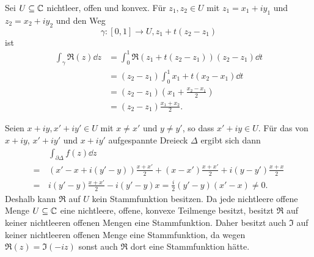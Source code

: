 \documentclass[a4paper,10pt]{article}
\begin{document}
Sei $U \subseteq \mathbb{C}$ nichtleer, offen und konvex. Für $z_1, z_2 \in U$ mit $z_1 = x_1 + iy_1$ und $z_2 = x_2 + iy_2$ und den Weg
\[
 \gamma : [0,1] \to U, z_1 + t(z_2 - z_1)
\]
ist
\begin{align*}
 \int_\gamma \Re(z) \dd{z}
 &= \int_0^1 \Re(z_1 + t(z_2 - z_1)) (z_2 - z_1) \dd{t} \\
 &= (z_2 - z_1) \int_0^1 x_1 + t(x_2 - x_1) \dd{t} \\
 &= (z_2 - z_1) \left( x_1 + \frac{x_2 - x_1}{2} \right) \\
 &= (z_2 - z_1) \frac{x_1 + x_2}{2}.
\end{align*}

Seien $x+iy, x'+iy' \in U$ mit $x \neq x'$ und $y \neq y'$, so dass $x'+iy \in U$. Für das von $x+iy$, $x'+iy'$ und $x+iy'$ aufgespannte Dreieck $\Delta$ ergibt sich dann
\begin{align*}
  &\, \int_{\partial \Delta} f(z) \dd{z} \\
 =&\, (x'-x+i(y'-y))\frac{x+x'}{2} + (x-x')\frac{x+x'}{2} + i(y-y')\frac{x+x}{2} \\
 =&\, i(y'-y) \frac{x+x'}{2} - i(y'-y)x
 = \frac{i}{2}(y'-y)(x'-x)
 \neq 0.
\end{align*}
Deshalb kann $\Re$ auf $U$ kein Stammfunktion besitzen. Da jede nichtleere offene Menge $U \subseteq \mathbb{C}$ eine nichtleere, offene, konvexe Teilmenge besitzt, besitzt $\Re$ auf keiner nichtleeren offenen Mengen eine Stammfunktion. Daher besitzt auch $\Im$ auf keiner nichtleeren offenen Menge eine Stammfunktion, da wegen $\Re(z) = \Im(-iz)$ sonst auch $\Re$ dort eine Stammfunktion hätte.
\end{document}
